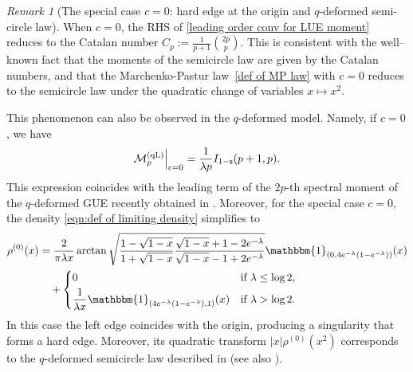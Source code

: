 \documentclass{amsart}
\theoremstyle{plain}
\theoremstyle{remark}
\newtheorem{rem}{Remark}
\numberwithin{equation}{section}
\begin{document}
\begin{rem}[The special case $c=0$: hard edge at the origin and $q$-deformed semi-circle law] 
When $c=0$, the RHS of \eqref{leading order conv for LUE moment} reduces to the Catalan number $C_p := \frac{1}{p+1} \binom{2p}{p}$.  
This is consistent with the well--known fact that the moments of the semicircle law are given by the Catalan numbers, and that the Marchenko-Pastur law~\eqref{def of MP law} with $c=0$ reduces to the semicircle law under the quadratic change of variables $x \mapsto x^{2}$.  

This phenomenon can also be observed in the $q$-deformed model. 
Namely, if $c=0$, we have
    \begin{equation}
        \mathcal{M}^{ \rm (qL) }_{p}\Big|_{c=0}=\frac{1}{\lambda p}I_{1- \mathsf{s} }(p+1,p).
    \end{equation}
This expression coincides with the leading term of the $2p$-th spectral moment of the $q$-deformed GUE recently obtained in \cite[Theorem~2.3]{BFO24}.  
Moreover, for the special case $c=0$, the density \eqref{eqn:def of limiting density} simplifies to  
\begin{align}
\begin{split}
  \rho^{(0)}(x)
            &=\frac{2}{\pi\lambda x}\arctan\sqrt{\frac{1-\sqrt{1-x}}{1+\sqrt{1-x}}\frac{\sqrt{1-x}+1-2e^{-\lambda}}{\sqrt{1-x}-1+2e^{-\lambda}}}\mathbbm{1}_{(0,4e^{-\lambda}(1-e^{-\lambda}) )}(x)
            \\
            &\quad +
            \begin{cases}
                0&\textup{if }\lambda \leq \log 2,
                \smallskip 
                \\
                \displaystyle\frac{1}{\lambda x}\mathbbm{1}_{( 4e^{-\lambda}(1-e^{-\lambda}) ,1)}(x)&\textup{if }\lambda>\log2. 
            \end{cases}
\end{split}
\end{align} 
    In this case the left edge coincides with the origin, producing a singularity that forms a hard edge. Moreover, its quadratic transform $|x| \rho^{(0)}(x^2)$ corresponds to the $q$-deformed semicircle law described in \cite[Theorem~2.6]{BFO24} (see also \cite[Remark~4]{BJO25}).
\end{rem}

 
 
\end{document}
